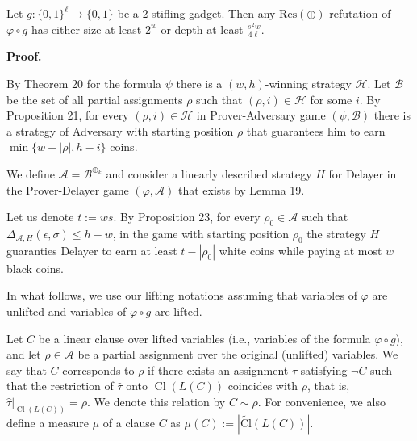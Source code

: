 \documentclass[10pt,a4paper]{article}
\begin{document}
Let $g\colon\{0,1\}^{\ell}\to\{0,1\}$ be a 2-stifling gadget.
Then any $\mathrm{Res}(\oplus)$ refutation of $\varphi\circ g$ has either size at least $2^{w}$ or depth at least
$\frac{s^{2}w}{4\ell}$.\par



\par\medskip\noindent\textbf{Proof.}\par


By Theorem 20 for the formula $\psi$ there is a $(w,h)$-winning strategy $\mathcal{H}$.
Let $\mathcal{B}$ be the set of all partial assignments $\rho$ such that $(\rho,i)\in\mathcal{H}$ for some $i$.
By Proposition 21, for every $(\rho,i)\in\mathcal{H}$ in Prover-Adversary game
$(\psi,\mathcal{B})$ there is a strategy of Adversary with starting position $\rho$ that guarantees him to earn
$\min\{w-|\rho|,h-i\}$ coins.\par



We define $\mathcal{A}=\mathcal{B}^{\oplus_{k}}$ and consider a linearly described strategy $H$ for Delayer in the
Prover-Delayer game $(\varphi,\mathcal{A})$ that exists by Lemma 19.\par



Let us denote $t:=ws$.
By Proposition 23, for every $\rho_{0}\in\mathcal{A}$ such that $\Delta_{\mathcal{A},H}(\epsilon,\sigma)\leq h-w$,
in the game with starting position $\rho_{0}$ the strategy $H$ guaranties Delayer to earn at least $t-|\rho_{0}|$ white coins
while paying at most $w$ black coins.\par



In what follows, we use our lifting notations assuming that variables of $\varphi$ are unlifted and variables of $\varphi\circ g$ are lifted.\par



Let $C$ be a linear clause over lifted variables (i.e., variables of the formula $\varphi\circ g$),
and let $\rho\in\mathcal{A}$ be a partial assignment over the original (unlifted) variables.
We say that $C$ corresponds to $\rho$ if there exists an assignment $\tau$ satisfying $\lnot C$ such that
the restriction of $\hat{\tau}$ onto $\operatorname{Cl}(L(C))$ coincides with $\rho$, that is, $\hat{\tau}|_{\operatorname{Cl}(L(C))}=\rho$.
We denote this relation by $C\sim\rho$.
For convenience, we also define a measure $\mu$ of a clause $C$ as
$\mu(C):=\left|\operatorname{\widetilde{Cl}}(L(C))\right|$.\par
\end{document}
